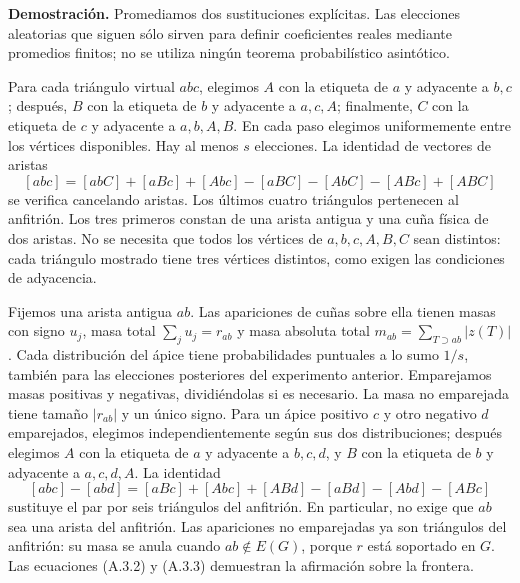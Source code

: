 \documentclass[spanish,11pt,a4paper]{article}
\begin{document}
\textbf{Demostración.} Promediamos dos sustituciones explícitas. Las elecciones aleatorias que siguen sólo sirven para definir coeficientes reales mediante promedios finitos; no se utiliza ningún teorema probabilístico asintótico.

Para cada triángulo virtual \(abc\), elegimos \(A\) con la etiqueta de \(a\) y adyacente a \(b,c\); después, \(B\) con la etiqueta de \(b\) y adyacente a \(a,c,A\); finalmente, \(C\) con la etiqueta de \(c\) y adyacente a \(a,b,A,B\). En cada paso elegimos uniformemente entre los vértices disponibles. Hay al menos \(s\) elecciones. La identidad de vectores de aristas \[[abc]=[abC]+[aBc]+[Abc]-[aBC]-[AbC]-[ABc]+[ABC]
\tag{A.3.2}\] se verifica cancelando aristas. Los últimos cuatro triángulos pertenecen al anfitrión. Los tres primeros constan de una arista antigua y una cuña física de dos aristas. No se necesita que todos los vértices de \(a,b,c,A,B,C\) sean distintos: cada triángulo mostrado tiene tres vértices distintos, como exigen las condiciones de adyacencia.

Fijemos una arista antigua \(ab\). Las apariciones de cuñas sobre ella tienen masas con signo \(u_j\), masa total \(\sum_j u_j=r_{ab}\) y masa absoluta total \(m_{ab}=\sum_{T\supset ab}|z(T)|\). Cada distribución del ápice tiene probabilidades puntuales a lo sumo \(1/s\), también para las elecciones posteriores del experimento anterior. Emparejamos masas positivas y negativas, dividiéndolas si es necesario. La masa no emparejada tiene tamaño \(|r_{ab}|\) y un único signo. Para un ápice positivo \(c\) y otro negativo \(d\) emparejados, elegimos independientemente según sus dos distribuciones; después elegimos \(A\) con la etiqueta de \(a\) y adyacente a \(b,c,d\), y \(B\) con la etiqueta de \(b\) y adyacente a \(a,c,d,A\). La identidad \[[abc]-[abd]=
[aBc]+[Abc]+[ABd]-[aBd]-[Abd]-[ABc]
\tag{A.3.3}\] sustituye el par por seis triángulos del anfitrión. En particular, no exige que \(ab\) sea una arista del anfitrión. Las apariciones no emparejadas ya son triángulos del anfitrión: su masa se anula cuando \(ab\notin E(G)\), porque \(r\) está soportado en \(G\). Las ecuaciones (A.3.2) y (A.3.3) demuestran la afirmación sobre la frontera.
\end{document}
